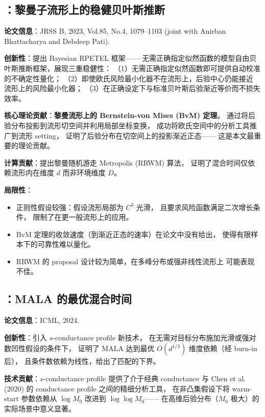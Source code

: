 \subsection{\citep{tang2023robust}：黎曼子流形上的稳健贝叶斯推断}\label{sec:ch0-jrssb2023}

\textbf{论文信息}：JRSS B, 2023, Vol.85, No.4, 1079--1103
(joint with Anirban Bhattacharya and Debdeep Pati).

\textbf{创新性}：提出 Bayesian RPETEL 框架——
无需正确指定似然函数的模型自由贝叶斯推断框架，展现三重稳健性：
（1）无需正确指定似然函数即可提供自动校准的不确定性量化；
（2）即使欧氏风险最小化器不在流形上，后验中心仍能接近
流形上的风险最小化器；
（3）在正确设定下与标准贝叶斯后验渐近等价而不损失效率。

\textbf{核心理论贡献}：\textbf{黎曼流形上的 Bernstein-von Mises (BvM) 定理}。
通过将后验分布投影到流形切空间并利用局部坐标变换，
成功将欧氏空间中的分析工具推广到流形 setting，
证明了后验分布在切空间上的投影渐近正态——
这是本文最重要的理论贡献。

\textbf{计算贡献}：提出黎曼随机游走 Metropolis (RRWM) 算法，
证明了混合时间仅依赖流形内在维度 $d$ 而非环境维度 $D$。

\textbf{局限性}：

\begin{itemize}
    \item 正则性假设较强：假设流形局部为 $C^3$ 光滑，
          且要求风险函数满足二次增长条件，
          限制了在更一般流形上的应用。
    \item BvM 定理的收敛速度（到渐近正态的速率）在论文中没有给出，
          使得有限样本下的可靠性难以量化。
    \item RRWM 的 proposal 设计较为简单，在多峰分布或强非线性流形上
          可能表现不佳。
\end{itemize}

\subsection{\citep{tang2024mala}：MALA 的最优混合时间}\label{sec:ch0-icml2024}

\textbf{论文信息}：ICML, 2024.

\textbf{创新性}：引入 $s$-conductance profile 新技术，
在无需对目标分布施加光滑或强对数凹性假设的条件下，
证明了 MALA 达到最优 $O(d^{1/3})$ 维度依赖（经 burn-in 后），
且条件数依赖为线性，给出了匹配的下界。

\textbf{技术贡献}：$s$-conductance profile 提供了介于经典 conductance
与 Chen et al. (2020) 的 conductance profile 之间的精细分析工具，
在非凸集假设下将 warm-start 参数依赖从 $\log M_0$ 改进到 $\log\log M_0$——
在高维后验分布（$M_0$ 极大）的实际场景中意义显著。

